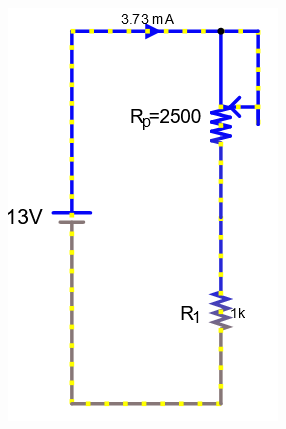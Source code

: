 \documentclass[a4paper]{article}
\begin{document}
\begin{figure}[H]
\begin{subfigure}{0.333\textwidth}
        \includegraphics[width=.9\linewidth]{amp13}
    \end{subfigure}
    \begin{subfigure}{0.333\textwidth}

\end{subfigure}
\end{figure}
\end{document}
